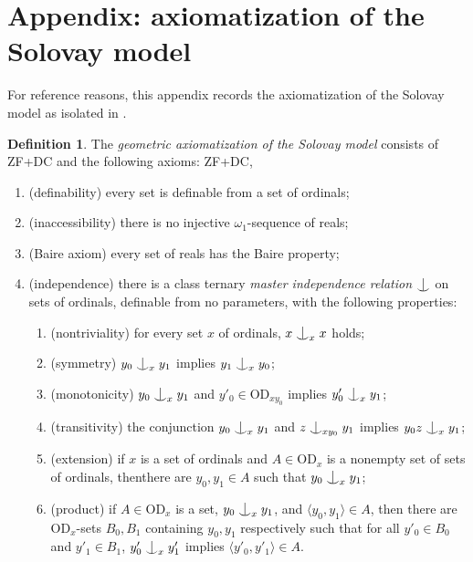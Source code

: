 \documentclass{article}
\newcommand{\gw}{\omega}
\newcommand{\vd}{\mathrm{OD}}
\newcommand{\forkindep}[1][]{%
  \mathrel{
    \mathop{
      \vcenter{
        \hbox{\oalign{\noalign{\kern-.3ex}\hfil$\vert$\hfil\cr
              \noalign{\kern-.7ex}
              $\smile$\cr\noalign{\kern-.3ex}}}
      }
    }\displaylimits_{#1}
  }
}
\theoremstyle{definition}
\newtheorem{definition}[theorem]{Definition}
\begin{document}
\section{Appendix: axiomatization of the Solovay model}
\label{axiomatizationsection}

For reference reasons, this appendix records the axiomatization of the Solovay model as isolated in \cite{z:reloadedA}.

\begin{definition}
The \emph{geometric axiomatization of the Solovay model} consists of ZF+DC and the following axioms: ZF+DC, 

\begin{enumerate}
\item (definability) every set is definable from a set of ordinals;
\item (inaccessibility) there is no injective $\gw_1$-sequence of reals;
\item (Baire axiom) every set of reals has the Baire property;
\item (independence) there is a class ternary \emph{master independence relation} $\forkindep$ on sets of ordinals, definable from no parameters, with the following properties:

\begin{enumerate}
	\item (nontriviality) for every set $x$ of ordinals, $x\forkindep[x] x$ holds;
\item (symmetry) $y_0\forkindep[x]y_1$ implies $y_1\forkindep[x]y_0$;
\item (monotonicity) $y_0\forkindep[x]y_1$ and $y'_0\in\vd_{xy_0}$ implies $y'_0\forkindep[x]y_1$;
\item (transitivity) the conjunction $y_0\forkindep[x]y_1$ and $z\forkindep[xy_0]y_1$ implies $y_0z\forkindep[x]y_1$;
\item (extension) if $x$ is a set of ordinals and $A\in\vd_x$ is a nonempty set of sets of ordinals, thenthere are $y_0, y_1\in A$ such that $y_0\forkindep[x]y_1$;
\item (product) if $A\in\vd_x$ is a set, $y_0\forkindep[x]y_1$, and $\langle y_0, y_1\rangle\in A$, then there are $\vd_x$-sets $B_0, B_1$ containing $y_0, y_1$ respectively such that for all $y'_0\in B_0$ and $y'_1\in B_1$, $y'_0\forkindep[x]y'_1$ implies $\langle y'_0, y'_1\rangle\in A$.
\end{enumerate}
\end{enumerate}
\end{definition}
\end{document}
